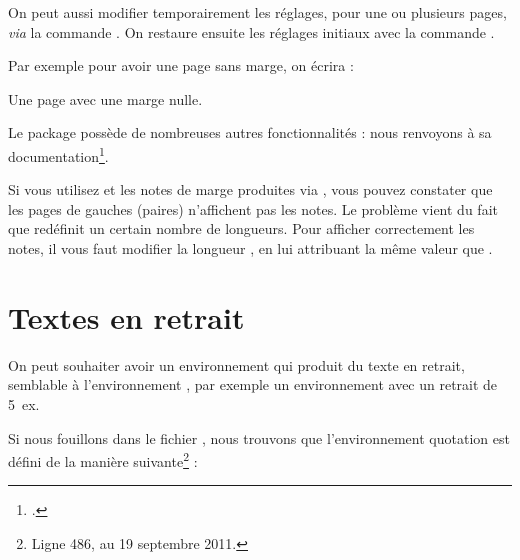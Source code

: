 On peut aussi modifier temporairement les réglages, pour une ou plusieurs pages, \emph{via} la commande . On restaure ensuite les réglages initiaux  avec la commande .

Par exemple pour avoir une page sans marge, on écrira :

\begin{latexcode}
Une page avec une marge nulle.
\newpage
\restoregeometry
\end{latexcode}

Le package  possède de nombreuses autres fonctionnalités : nous renvoyons à sa documentation\footcite{geometry}.

\begin{attention}
Si vous utilisez  et les notes de marge produites via , vous pouvez constater que les pages de gauches (paires) n'affichent pas les notes. Le problème vient du fait que  redéfinit un certain nombre de longueurs. Pour afficher correctement les notes, il vous faut modifier la longueur , en lui attribuant la même valeur que .

\begin{latexcode}
\setlength{\marginparwidth}{\leftmargin}
\end{latexcode}
\end{attention}

\section{Textes en retrait}

On peut souhaiter avoir un environnement qui produit du texte en retrait, semblable à l'environnement , par exemple un environnement  avec un retrait de 5~ex.

Si nous fouillons dans le fichier , nous trouvons que l'environnement quotation est défini de la manière suivante\footnote{Ligne 486, au 19 septembre 2011.} :

\begin{latexcode}
\newenvironment{quotation}
               {\list{}{\listparindent 1.5em %
                        \itemindent    \listparindent
                        \rightmargin   \leftmargin
                        \parsep        \z@ \@plus\p@}%
                \item\relax}
               {\endlist}
\end{latexcode}

